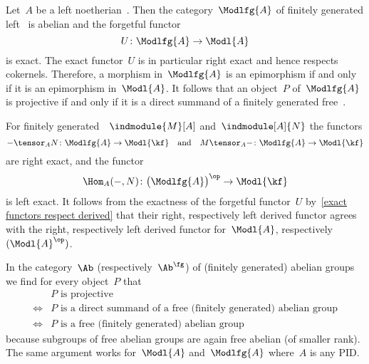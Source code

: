 \begin{remark}
  Let~$A$ be a left noetherian~{\kalg}.
  Then the category~$\Modlfg{A}$ of finitely generated left~{} is abelian and the forgetful functor
  \[
    U
    \colon
    \Modlfg{A}
    \to
    \Modl{A}
  \]
  is exact.
  The exact functor~$U$ is in particular right exact and hence respects cokernels.
  Therefore, a morphism in~$\Modlfg{A}$ is an epimorphism if and only if it is an epimorphism in~$\Modl{A}$.
  It follows that an object~$P$ of~$\Modlfg{A}$ is projective if and only if it is a direct summand of a finitely 
  generated free~{}.
  
  For finitely generated~{}~$\indmodule{M}[A]$ and~$\indmodule[A]{N}$ the functors
  \[
    - \tensor_A N
    \colon
    \Modlfg{A}
    \to
    \Modl{\kf}
    \quad\text{and}\quad
    M \tensor_A -
    \colon
    \Modlfg{A}
    \to
    \Modl{\kf}
  \]
  are right exact, and the functor
  \[
    \Hom_A(-,N)
    \colon
    \bigl( \Modlfg{A} \bigr)^\op
    \to
    \Modl{\kf}
  \]
  is left exact.
  It follows from the exactness of the forgetful functor~$U$ by~\cref{exact functors respect derived} that their right, respectively left derived functor agrees with the right, respectively left derived functor for~$\Modl{A}$, respectively~$(\Modl{A}^\op)$.
\end{remark}










\begin{example}
  In the category~$\Ab$ (respectively~$\Ab^\fg$) of (finitely generated) abelian groups we find for every object~$P$ that
  \begin{align*}
    {}&
    \text{$P$ is projective}
    \\
    \iff{}&
    \text{$P$ is a direct summand of a free (finitely generated) abelian group}
    \\
    \iff{}&
    \text{$P$ is a free (finitely generated) abelian group}
  \end{align*}
  because subgroups of free abelian groups are again free abelian (of smaller rank).
  The same argument works for~$\Modl{A}$ and~$\Modlfg{A}$ where~$A$ is any PID.
\end{example}




